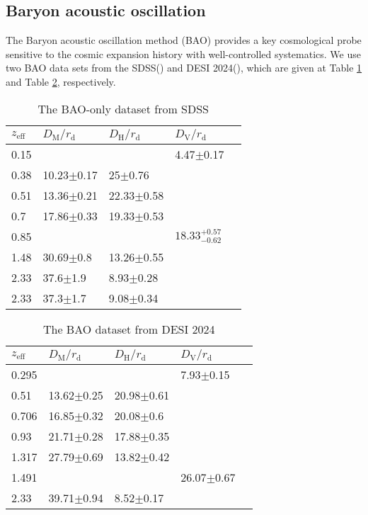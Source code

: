 \documentclass{aa}
\begin{document}
\subsection{Baryon acoustic oscillation}

   The Baryon acoustic oscillation method (BAO) provides a key cosmological probe
   sensitive to the cosmic expansion history with well-controlled systematics.
   We use two BAO data sets from the SDSS(\cite{PhysRevD.103.083533}) and DESI 2024(\cite{desicollaboration2024desi2024vicosmological}),
   which are given at Table \ref{tab:2} and Table \ref{tab:3}, respectively.

   \begin{table}[htbp]
      \caption{The BAO-only dataset from SDSS}
      \centering
      \begin{tabular}{lllll}
         \hline\hline
            $z_{\text{eff}}$ & $D_{\text{M}}/r_{\text{d}}$ & $D_{\text{H}}/r_{\text{d}}$ & $D_{\text{V}}/r_{\text{d}}$ \\
            \hline
            0.15 & & & 4.47$\pm$0.17 \\
            0.38 & 10.23$\pm$0.17 & 25$\pm$0.76 & \\
            0.51 & 13.36$\pm$0.21 & 22.33$\pm$0.58 & \\
            0.7 & 17.86$\pm$0.33 & 19.33$\pm$0.53 & \\
            0.85 & & & $18.33_{-0.62}^{+0.57}$ \\
            1.48 & 30.69$\pm$0.8 & 13.26$\pm$0.55 & \\
            2.33 & 37.6$\pm$1.9 & 8.93$\pm$0.28 & \\
            2.33 & 37.3$\pm$1.7 & 9.08$\pm$0.34 & \\
            \hline
      \end{tabular}
      \label{tab:2}
   \end{table}

   \begin{table}[htbp]
      \caption{The BAO dataset from DESI 2024}
      \centering
      \begin{tabular}{lllll}
         \hline\hline
            $z_{\text{eff}}$ & $D_{\text{M}}/r_{\text{d}}$ & $D_{\text{H}}/r_{\text{d}}$ & $D_{\text{V}}/r_{\text{d}}$ \\
            \hline
            0.295 & & & 7.93$\pm$0.15 \\
            0.51 & 13.62$\pm$0.25 & 20.98$\pm$0.61 & \\
            0.706 & 16.85$\pm$0.32 & 20.08$\pm$0.6 & \\
            0.93 & 21.71$\pm$0.28 & 17.88$\pm$0.35 & \\
            1.317 & 27.79$\pm$0.69 & 13.82$\pm$0.42 & \\
            1.491 & & & 26.07$\pm$0.67 \\
            2.33 & 39.71$\pm$0.94 & 8.52$\pm$0.17 & \\
            \hline
      \end{tabular}
      \label{tab:3}
   \end{table}
\end{document}
